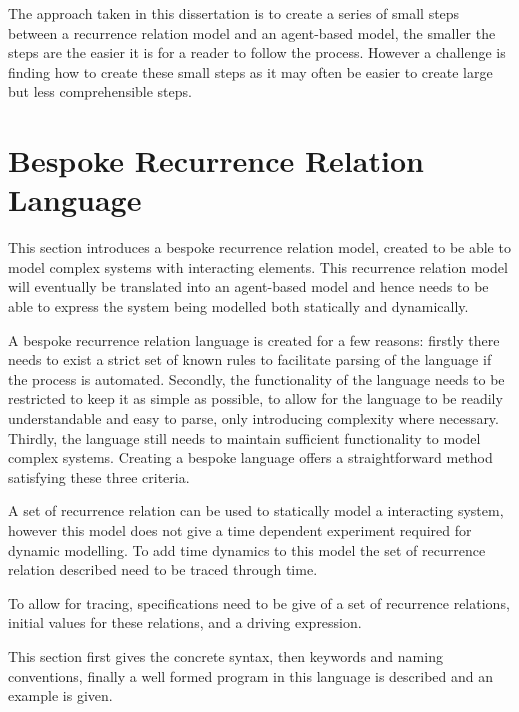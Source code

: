 \documentclass{article}
\begin{document}
The approach taken in this dissertation is to create a series of small steps between a recurrence relation model and an agent-based model, the smaller the steps are the easier it is for a reader to follow the process. However a challenge is finding how to create these small steps as it may often be easier to create large but less comprehensible steps.   








\newpage
\section{Bespoke Recurrence Relation Language} \label{beskoperecurrancerealtion}
This section introduces a bespoke recurrence relation model, created to be able to model complex systems with interacting elements. This recurrence relation model will eventually be translated into an agent-based model and hence needs to be able to express the system being modelled both statically and dynamically. 

A bespoke recurrence relation language is created for a few reasons: firstly there needs to exist a strict set of known rules to facilitate parsing of the language if the process is automated. Secondly, the functionality of the language needs to be restricted to keep it as simple as possible, to allow for the language to be readily understandable and easy to parse, only introducing complexity where necessary. Thirdly, the language still needs to maintain sufficient functionality to model complex systems. Creating a bespoke language offers a straightforward method satisfying these three criteria.     
 
A set of recurrence relation can be used to statically model a interacting system, however this model does not give a time dependent  experiment required for dynamic modelling. To add time dynamics to this model the set of recurrence relation described need to be traced through time.

To allow for tracing, specifications need to be give of a set of recurrence relations, initial values for these relations, and a driving expression. 

This section first gives the concrete syntax, then keywords and naming conventions, finally a well formed program in this language is described and an example is given.  
 
\end{document}
